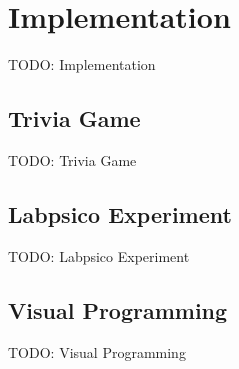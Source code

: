 \chapter{Implementation}

TODO: Implementation

\section{Trivia Game}

TODO: Trivia Game

\section{Labpsico Experiment}

TODO: Labpsico Experiment

\section{Visual Programming}

TODO: Visual Programming
